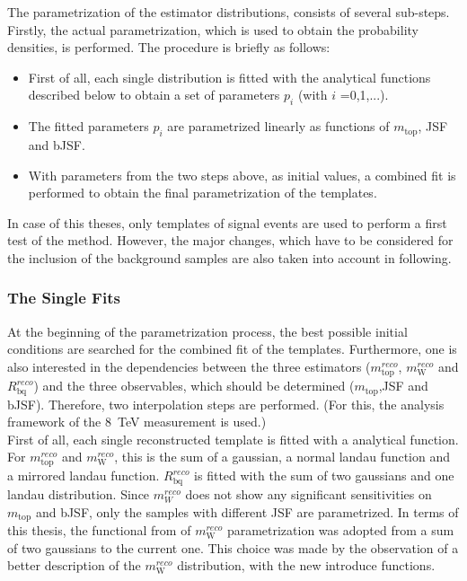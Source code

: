 {{The parametrization of the estimator distributions, consists of several sub-steps. Firstly, the actual parametrization, which is used to obtain the probability densities, is performed. The procedure is briefly as follows: 
\begin{itemize}
	\item First of all, each single distribution is fitted with the analytical functions described below to obtain a set of parameters $p_i$ (with $i$ =0,1,...).
	\item The fitted parameters $p_i$ are parametrized linearly as functions of $m_{\text{top}}$, JSF and bJSF. 
	\item With parameters from the two steps above, as initial values, a combined fit is performed to obtain the final parametrization of the templates.
\end{itemize}   

 
\noindent In case of this theses,  only templates of signal events are used to perform a first test of the method. However, the major changes, which have to be considered for the inclusion of the background samples are also taken into account in following.\\  


\subsubsection{The Single Fits}  


\noindent At the beginning of the parametrization process, the best possible initial conditions are searched for the  combined fit of the templates. Furthermore, one is also interested in the dependencies between the three estimators ($m_{\text{top}}^{reco}$, $m_{\text{W}}^{reco}$ and $R_{\text{bq}}^{reco}$) and the three observables, which should be determined ($m_{\text{top}}$,JSF and bJSF). Therefore, two interpolation steps are performed. (For this, the analysis framework of the 8~TeV measurement is used.)\\

\noindent First of all, each single reconstructed template is fitted with a  analytical function. For  $m_{\text{top}}^{reco}$  and  $m_{\text{W}}^{reco}$, this is the sum of a gaussian, a normal landau function and a mirrored landau function.  $R_{\text{bq}}^{reco}$ is fitted with the sum of two gaussians and one landau distribution. 
Since $m_{W}^{reco}$ does not show any significant sensitivities on $m_{\text{top}}$ and bJSF, only the samples with different JSF are parametrized. 
In terms of this thesis, the functional from of $m_{\text{W}}^{reco}$ parametrization was adopted from a sum of two gaussians to the current one.  This choice was made by the observation of a better description of the $m_{\text{W}}^{reco}$ distribution, with the new introduce functions.\\

}}
